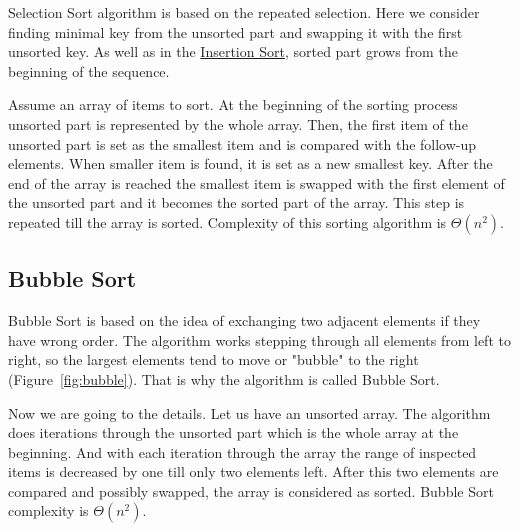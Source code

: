\documentclass[
  field=inf,
  biblatex,
  language=english,
  glossaries,
  theorems=false,
  sourcecodes=false,
  index
]{kidiplom}
\begin{document}
Selection Sort algorithm is based on the repeated selection. Here we consider finding minimal key from the unsorted part and swapping it with the first unsorted key. As well as in the \hyperref[sec:insertion]{Insertion Sort}, sorted part grows from the beginning of the sequence.

Assume an array of items to sort. At the beginning of the sorting process unsorted part is represented by the whole array. Then, the first item of the unsorted part is set as the smallest item and is compared with the follow-up elements. When smaller item is found, it is set as a new smallest key. After the end of the array is reached the smallest item is swapped with the first element of the unsorted part and it becomes the sorted part of the array. This step is repeated till the array is sorted. Complexity of this sorting algorithm is $\Theta(n^2)$.

\subsection{Bubble Sort}
\label{sec:bubble}
Bubble Sort is based on the idea of exchanging two adjacent elements if they have wrong order. The algorithm works stepping through all elements from left to right, so the largest elements tend to move or "bubble" to the right \mbox{(Figure \ref{fig:bubble})}. That is why the algorithm is called Bubble Sort.

Now we are going to the details. Let us have an unsorted array. The algorithm does iterations through the unsorted part which is the whole array at the beginning. And with each iteration through the array the range of inspected items is decreased by one till only two elements left. After this two elements are compared and possibly swapped, the array is considered as sorted. Bubble Sort complexity is $\Theta(n^2)$.
\end{document}
